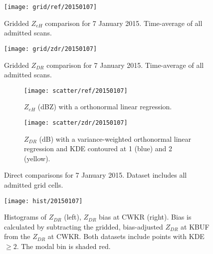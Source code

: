 \begin{figure}[H]
\texttt{[image: grid/ref/20150107]}
\caption{Gridded $Z_{eH}$ comparison for 7 January 2015. Time-average of all admitted scans.} 
\label{fig:grid_ref_20150107}
\end{figure}

\begin{figure}[H]
\texttt{[image: grid/zdr/20150107]}
\caption{Gridded $Z_{DR}$ comparison for 7 January 2015. Time-average of all admitted scans.} 
\label{fig:grid_zdr_20150107}
\end{figure}
\begin{figure}[H]
\centering
   \begin{subfigure}[t]{0.48\linewidth} \centering
     \texttt{[image: scatter/ref/20150107]}
     \caption{$Z_{eH}$ (dBZ) with a orthonormal linear regression.}\label{fig:scatter_ref_20150107}
   \end{subfigure}
   \begin{subfigure}[t]{0.48\linewidth} \centering
     \texttt{[image: scatter/zdr/20150107]}
     \caption{$Z_{DR}$ (dB) with a variance-weighted orthonormal linear regression and KDE contoured at 1 (blue) and 2 (yellow).}\label{fig:scatter_zdr_20150107}
   \end{subfigure}
\caption{Direct comparisons for 7 January 2015. Dataset includes all admitted grid cells.} \label{fig:scatter_20150107}
\end{figure}

\begin{figure}[H]
\texttt{[image: hist/20150107]}\centering
\caption{Histograms of $Z_{DR}$ (left), $Z_{DR}$ bias at CWKR (right). Bias is calculated by subtracting the gridded, bias-adjusted $Z_{DR}$ at KBUF from the
$Z_{DR}$ at CWKR. Both datasets include points with KDE $\geq 2$. The modal bin is shaded red.} 
\label{fig:hist_20150107}
\end{figure}

